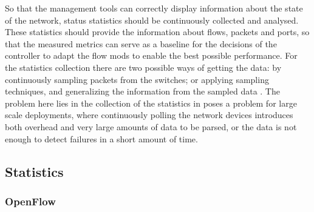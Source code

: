So that the management tools can correctly display information about the state of the network, status statistics should be continuously collected and analysed. These statistics should provide the information about flows, packets
and ports, so that the measured metrics can serve as a baseline for the decisions of the controller to adapt the flow mods to enable the best possible performance. For the statistics collection there are two possible ways of 
getting the data: by continuously sampling packets from the switches; or applying sampling techniques, and generalizing the information from the sampled data \cite{CITE - low_overhead_te_elephants_detec}. The problem here lies
in the collection of the statistics in poses a problem for large scale deployments, where continuously polling the network devices introduces both overhead and very large amounts of data to be parsed, or the data is not enough
to detect failures in a short amount of time.

\subsection {Statistics}

\subsubsection {OpenFlow}

